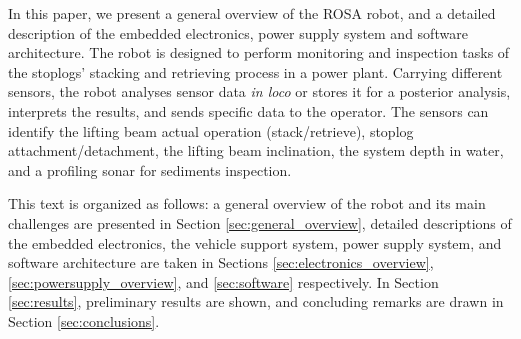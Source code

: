 In this paper, we present a general overview of the ROSA robot, and a detailed
description of the embedded electronics, power supply system and software
architecture. The robot is designed to perform monitoring and inspection
tasks of the stoplogs' stacking and retrieving process in a power
plant. Carrying different sensors, the robot analyses sensor data \emph{in
loco} or stores it for a posterior analysis, interprets the results, and
sends specific data to the operator. The sensors can identify the lifting beam
actual operation (stack/retrieve), stoplog attachment/detachment, the
lifting beam inclination, the system depth in water, and a
profiling sonar for sediments inspection. 

This text is organized as follows: a general overview of the robot and its main
challenges are presented in Section \ref{sec:general_overview}, detailed
descriptions of the embedded electronics, the vehicle support system, power
supply system, and software architecture are taken in
Sections \ref{sec:electronics_overview}, \ref{sec:powersupply_overview}, and
\ref{sec:software} respectively.
In Section \ref{sec:results}, preliminary results are shown, and concluding
remarks are drawn in Section \ref{sec:conclusions}.